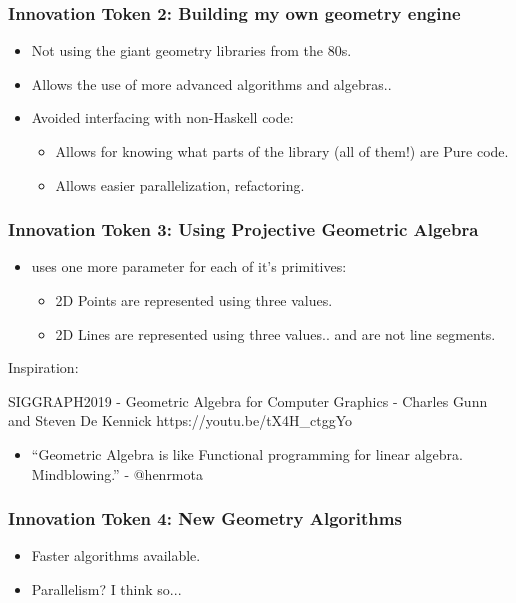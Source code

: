 \documentclass[hyperref={pdfpagemode=FullScreen},aspectratio=169]{beamer}
\begin{document}
\begin{frame}
  \frametitle{Innovation Token 2: Building my own geometry engine}
  \begin{itemize}
  \item Not using the giant geometry libraries from the 80s.
  \item Allows the use of more advanced algorithms and algebras..
  \item Avoided interfacing with non-Haskell code:
    \begin{itemize}
    \item Allows for knowing what parts of the library (all of them!) are Pure code.
    \item Allows easier parallelization, refactoring.
    \end{itemize}
  \end{itemize}
\end{frame}

\begin{frame}
  \frametitle{Innovation Token 3: Using Projective Geometric Algebra}
  \begin{itemize}
  \item uses one more parameter for each of it's primitives:
    \begin{itemize}
    \item 2D Points are represented using three values.
    \item 2D Lines are represented using three values.. and are not line segments.
    \end{itemize}
  \end{itemize}
  Inspiration:
  \begin{block}{SIGGRAPH2019 - Geometric Algebra for Computer Graphics - Charles Gunn and Steven De Kennick}
    https://youtu.be/tX4H\_ctggYo
  \end{block}
  \begin{itemize}
  \item ``Geometric Algebra is like Functional programming for linear algebra. Mindblowing.'' - @henrmota
  \end{itemize}
\end{frame}

\begin{frame}
  \frametitle{Innovation Token 4: New Geometry Algorithms}
  \begin{itemize}
  \item Faster algorithms available.
  \item Parallelism? I think so...
  \end{itemize}
\end{frame}
\end{document}
